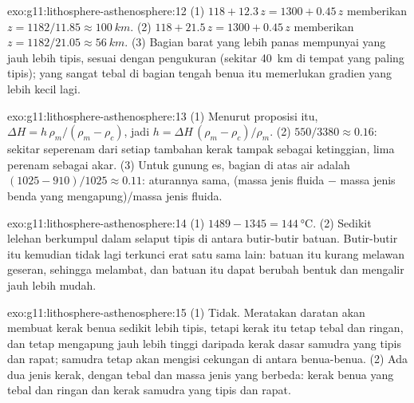\begin{solution}{exo:g11:lithosphere-asthenosphere:12}
(1) $118 + 12.3\,z = 1300 + 0.45\,z$ memberikan $z = 1182/11.85 \approx
\qty{100}{km}$. (2) $118 + 21.5\,z = 1300 + 0.45\,z$ memberikan $z = 1182/21.05
\approx \qty{56}{km}$. (3) Bagian barat yang lebih panas mempunyai  yang
jauh lebih tipis, sesuai dengan pengukuran (sekitar \qty{40}{km} di tempat yang
paling tipis);  yang sangat tebal di bagian tengah benua itu memerlukan
gradien yang lebih kecil lagi.
\end{solution}

\begin{solution}{exo:g11:lithosphere-asthenosphere:13}
(1) Menurut proposisi itu, $\Delta H = h\,\rho_m/(\rho_m - \rho_c)$, jadi $h =
\Delta H\,(\rho_m - \rho_c)/\rho_m$. (2) $550/3380 \approx 0.16$: sekitar
seperenam dari setiap tambahan kerak tampak sebagai ketinggian, lima perenam
sebagai akar. (3) Untuk gunung es, bagian di atas air adalah
$(1025 - 910)/1025 \approx 0.11$: aturannya sama, (massa jenis fluida $-$ massa
jenis benda yang mengapung)/massa jenis fluida.
\end{solution}

\begin{solution}{exo:g11:lithosphere-asthenosphere:14}
(1) $1489 - 1345 = \qty{144}{\celsius}$. (2) Sedikit lelehan berkumpul dalam
selaput tipis di antara butir-butir batuan. Butir-butir itu kemudian tidak lagi
terkunci erat satu sama lain: batuan itu kurang melawan geseran, sehingga
 melambat, dan batuan itu dapat berubah bentuk dan mengalir jauh
lebih mudah.
\end{solution}

\begin{solution}{exo:g11:lithosphere-asthenosphere:15}
(1) Tidak. Meratakan daratan akan membuat kerak benua sedikit lebih tipis,
tetapi kerak itu tetap tebal dan ringan, dan tetap mengapung jauh lebih tinggi
daripada kerak dasar samudra yang tipis dan rapat; samudra tetap akan mengisi
cekungan di antara benua-benua. (2) Ada dua jenis kerak, dengan tebal dan massa
jenis yang berbeda: kerak benua yang tebal dan ringan dan kerak samudra yang
tipis dan rapat.
\end{solution}

